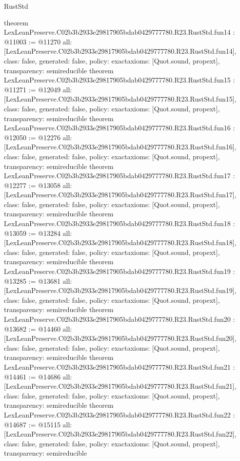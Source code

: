 \begin{lexlean}{RustStd}
\begin{coremodule}
{}
theorem LexLeanPreserve.C02b3b2933e29817905bdab0429777780.R23.RustStd.fun14 : @11003 := @11270 {
  all: [LexLeanPreserve.C02b3b2933e29817905bdab0429777780.R23.RustStd.fun14],
  class: false,
  generated: false,
  policy: exact{axioms: [Quot.sound, propext]},
  transparency: semireducible
}
theorem LexLeanPreserve.C02b3b2933e29817905bdab0429777780.R23.RustStd.fun15 : @11271 := @12049 {
  all: [LexLeanPreserve.C02b3b2933e29817905bdab0429777780.R23.RustStd.fun15],
  class: false,
  generated: false,
  policy: exact{axioms: [Quot.sound, propext]},
  transparency: semireducible
}
theorem LexLeanPreserve.C02b3b2933e29817905bdab0429777780.R23.RustStd.fun16 : @12050 := @12276 {
  all: [LexLeanPreserve.C02b3b2933e29817905bdab0429777780.R23.RustStd.fun16],
  class: false,
  generated: false,
  policy: exact{axioms: [Quot.sound, propext]},
  transparency: semireducible
}
theorem LexLeanPreserve.C02b3b2933e29817905bdab0429777780.R23.RustStd.fun17 : @12277 := @13058 {
  all: [LexLeanPreserve.C02b3b2933e29817905bdab0429777780.R23.RustStd.fun17],
  class: false,
  generated: false,
  policy: exact{axioms: [Quot.sound, propext]},
  transparency: semireducible
}
theorem LexLeanPreserve.C02b3b2933e29817905bdab0429777780.R23.RustStd.fun18 : @13059 := @13284 {
  all: [LexLeanPreserve.C02b3b2933e29817905bdab0429777780.R23.RustStd.fun18],
  class: false,
  generated: false,
  policy: exact{axioms: [Quot.sound, propext]},
  transparency: semireducible
}
theorem LexLeanPreserve.C02b3b2933e29817905bdab0429777780.R23.RustStd.fun19 : @13285 := @13681 {
  all: [LexLeanPreserve.C02b3b2933e29817905bdab0429777780.R23.RustStd.fun19],
  class: false,
  generated: false,
  policy: exact{axioms: [Quot.sound, propext]},
  transparency: semireducible
}
theorem LexLeanPreserve.C02b3b2933e29817905bdab0429777780.R23.RustStd.fun20 : @13682 := @14460 {
  all: [LexLeanPreserve.C02b3b2933e29817905bdab0429777780.R23.RustStd.fun20],
  class: false,
  generated: false,
  policy: exact{axioms: [Quot.sound, propext]},
  transparency: semireducible
}
theorem LexLeanPreserve.C02b3b2933e29817905bdab0429777780.R23.RustStd.fun21 : @14461 := @14686 {
  all: [LexLeanPreserve.C02b3b2933e29817905bdab0429777780.R23.RustStd.fun21],
  class: false,
  generated: false,
  policy: exact{axioms: [Quot.sound, propext]},
  transparency: semireducible
}
theorem LexLeanPreserve.C02b3b2933e29817905bdab0429777780.R23.RustStd.fun22 : @14687 := @15115 {
  all: [LexLeanPreserve.C02b3b2933e29817905bdab0429777780.R23.RustStd.fun22],
  class: false,
  generated: false,
  policy: exact{axioms: [Quot.sound, propext]},
  transparency: semireducible
}
\end{coremodule}
\end{lexlean}
